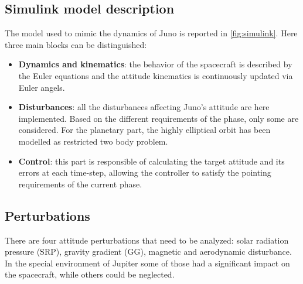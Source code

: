 \subsection{Simulink model description}
\label{subsec:simulink}


The model used to mimic the dynamics of Juno is reported in \autoref{fig:simulink}. Here three main blocks can be distinguished:

\begin{itemize}
    \item \textbf{Dynamics and kinematics}: the behavior of the spacecraft is described by the Euler equations and the attitude kinematics is continuously updated via Euler angels. 
    \item \textbf{Disturbances}: all the disturbances affecting Juno's attitude are here implemented. Based on the different requirements of the phase, only some are considered. For the planetary part, the highly elliptical orbit has been modelled as restricted two body problem. 
    \item \textbf{Control}: this part is responsible of calculating the target attitude and its errors at each time-step, allowing the controller to satisfy the pointing requirements of the current phase. 
\end{itemize}

\subsection{Perturbations}
\label{subsec:perturbations}

There are four attitude perturbations that need to be analyzed: solar radiation pressure (SRP), gravity gradient (GG), magnetic and aerodynamic disturbance. In the special environment of Jupiter some of those had a significant impact on the spacecraft, while others could be neglected. 


